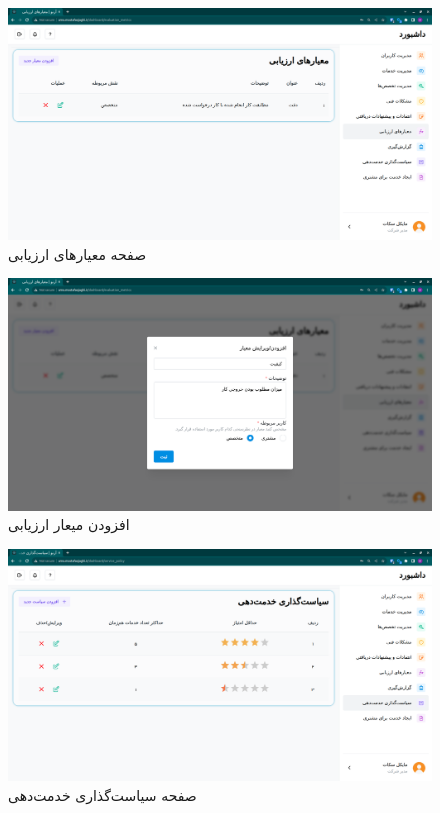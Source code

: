 \begin{figure}[h]
	\centering
	\includegraphics[width=\textwidth]{figs/user-guide/cm-evaluation-metrics}
	\caption{صفحه معیارهای ارزیابی}
	\label{cm-evaluation-metrics}
\end{figure}

\begin{figure}[h]
	\centering
	\includegraphics[width=\textwidth]{figs/user-guide/cm-add-evaluation-metric}
	\caption{افزودن میعار ارزیابی}
	\label{cm-add-evaluation-metric}
\end{figure}

\begin{figure}[h]
	\centering
	\includegraphics[width=\textwidth]{figs/user-guide/cm-service-policy}
	\caption{صفحه سیاست‌گذاری خدمت‌دهی}
	\label{cm-service-policy}
\end{figure}

\FloatBarrier
